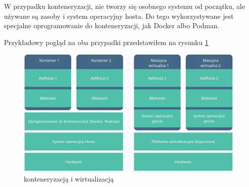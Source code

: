 \documentclass{iiuwb}
\begin{document}
W przypadku konteneryzacji, nie tworzy się osobnego systemu od początku, ale używane są zasoby i system operacyjny hosta. Do tego wykorzystywane jest specjalne oprogramowanie do konteneryzacji, jak Docker albo Podman.

Przykładowy pogląd na oba przypadki przedstawiłem na rysunku \ref{fig: Konteneryzacja i wirtualizacja}

\begin{figure}[!h]
\centering
\includegraphics[width=12cm]{kontenery_wirtualizacja.pdf}
\caption{konteneryzacją i wirtualizacją}
\label{fig: Konteneryzacja i wirtualizacja}
\end{figure}
\end{document}
